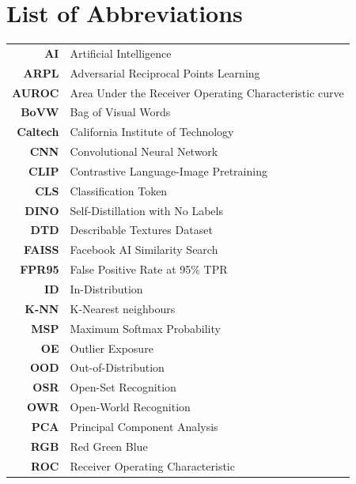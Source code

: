 \documentclass[oneside]{ctuthesis}
\begin{document}
\printbibliography[title=Literature]

\appendix

\chapter{List of Abbreviations}
\label{app_shortcuts}

\begin{center}
    \begin{tabular}{r p{25em}}
        \textbf{AI}     & Artificial Intelligence \\
        \textbf{ARPL}   & Adversarial Reciprocal Points Learning \\
        \textbf{AUROC}  & Area Under the Receiver Operating Characteristic curve \\
        \textbf{BoVW}   & Bag of Visual Words \\
        \textbf{Caltech} & California Institute of Technology \\
        \textbf{CNN}    & Convolutional Neural Network \\
        \textbf{CLIP}   & Contrastive Language-Image Pretraining \\
        \textbf{CLS} & Classification Token \\
        \textbf{DINO}   & Self-Distillation with No Labels \\
        \textbf{DTD}    & Describable Textures Dataset \\
        \textbf{FAISS}  & Facebook AI Similarity Search \\
        \textbf{FPR95}  & False Positive Rate at 95\% TPR \\
        \textbf{ID}     & In-Distribution \\
        \textbf{K-NN}   & K-Nearest neighbours \\
        \textbf{MSP}    & Maximum Softmax Probability \\
        \textbf{OE}     & Outlier Exposure \\
        \textbf{OOD}    & Out-of-Distribution \\
        \textbf{OSR}    & Open-Set Recognition \\
        \textbf{OWR}    & Open-World Recognition \\
        \textbf{PCA}    & Principal Component Analysis \\
        \textbf{RGB}    & Red Green Blue \\
        \textbf{ROC}    & Receiver Operating Characteristic \\

\end{tabular}
\end{center}
\end{document}
